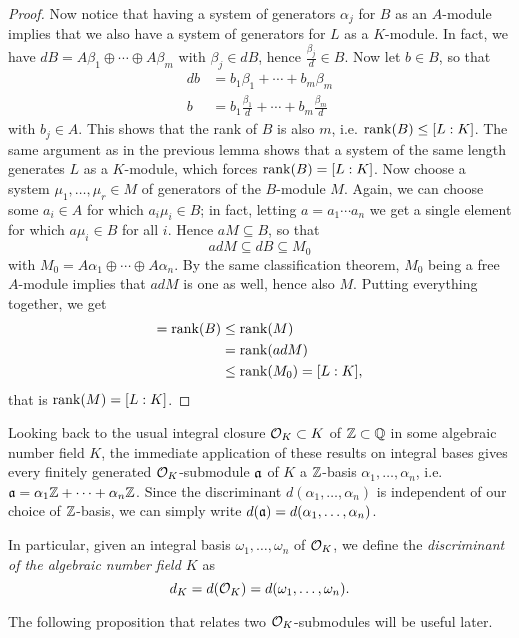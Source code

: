 \begin{proof}
	Now notice that having a system of generators $\alpha_j$ for $B$ as an $A$-module implies that we also have a system of generators for $L$ as a $K$-module. In fact, we have $dB=A\beta_1\oplus\cdots\oplus A\beta_m$ with $\beta_j\in dB$, hence $\frac{\beta_j}{d}\in B$. Now let $b\in B$, so that
	\begin{align*}
		db &= b_1\beta_1 + \cdots + b_m\beta_m\\
		b &= b_1\frac{\beta_1}{d} + \cdots + b_m\frac{\beta_m}{d}
	\end{align*}
	with $b_j\in A$. This shows that the rank of $B$ is also $m$, i.e. $\operatorname{rank}(B)\leq[L:K]$. The same argument as in the previous lemma shows that a system of the same length generates $L$ as a $K$-module, which forces $\operatorname{rank}(B)=[L:K]$. Now choose a system $\mu_1,\dots,\mu_r\in M$ of generators of the $B$-module $M$. Again, we can choose some $a_i\in A$ for which $a_i\mu_i\in B$; in fact, letting $a=a_1\cdots a_n$ we get a single element for which $a\mu_i\in B$ for all $i$. Hence $aM\subseteq B$, so that
	\[
		adM \subseteq dB \subseteq M_0
	\]
	with $M_0=A\alpha_1\oplus\cdots\oplus A\alpha_n$. By the same classification theorem, $M_0$ being a free $A$-module implies that $adM$ is one as well, hence also $M$. Putting everything together, we get
	\begin{align*}
		[L:K] = \rank(B) &\leq \rank(M)\\
			&= \rank(adM)\\
			&\leq \rank(M_0) = [L:K],
	\end{align*}
	that is $\operatorname{rank}(M)=[L:K]$.
\end{proof}

Looking back to the usual integral closure $\mathcal{O}_K\subset K$ of $\mathbb{Z}\subset\mathbb{Q}$ in some algebraic number field $K$, the immediate application of these results on integral bases gives every finitely generated $\mathcal{O}_K$-submodule $\mathfrak{a}$ of $K$ a $\mathbb{Z}$-basis $\alpha_1,\dots,\alpha_n$, i.e. $\mathfrak{a} = \alpha_1\mathbb{Z}+\cdots+\alpha_n\mathbb{Z}$. Since the discriminant $d(\alpha_1,\dots,\alpha_n)$ is independent of our choice of $\mathbb{Z}$-basis, we can simply write $d(\mathfrak{a})=d(\alpha_1,\dots,\alpha_n)$.

In particular, given an integral basis $\omega_1,\dots,\omega_n$ of $\mathcal{O}_K$, we define the \emph{discriminant of the algebraic number field $K$} as
\[
	d_K = d(\mathcal{O}_K) = d(\omega_1,\dots,\omega_n).
\]


The following proposition that relates two $\mathcal{O}_K$-submodules will be useful later.

